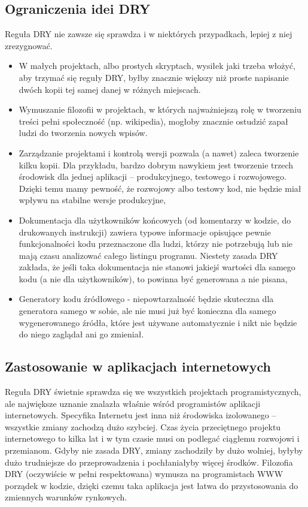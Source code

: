 \documentclass[a4paper,12pt,oneside]{report}
\begin{document}
\subsection{Ograniczenia idei DRY}
\label{sub:dry-not}
Reguła DRY nie zawsze się sprawdza i w niektórych przypadkach, lepiej z niej zrezygnować.
\begin{itemize}
  \item W małych projektach, albo prostych skryptach, wysiłek jaki trzeba włożyć, aby trzymać się reguły DRY, byłby znacznie większy niż proste napisanie dwóch kopii tej samej danej w różnych miejscach.
  \item Wymuszanie filozofii w projektach, w których najważniejszą rolę w tworzeniu treści pełni społeczność (np. wikipedia), mogłoby znacznie ostudzić zapał ludzi do tworzenia nowych wpisów.
  \item Zarządzanie projektami i kontrolą wersji pozwala (a nawet) zaleca tworzenie kilku kopii. Dla przykładu, bardzo dobrym nawykiem jest tworzenie trzech środowisk dla jednej aplikacji -- produkcyjnego, testowego i rozwojowego. Dzięki temu mamy pewność, że rozwojowy albo testowy kod, nie będzie miał wpływu na stabilne wersje produkcyjne,
  \item Dokumentacja dla użytkowników końcowych (od komentarzy w kodzie, do drukowanych instrukcji) zawiera typowe informacje opisujące pewnie funkcjonalności kodu przeznaczone dla ludzi, którzy nie potrzebują lub nie mają czasu analizować całego listingu programu. Niestety zasada DRY zakłada, że jeśli taka dokumentacja nie stanowi jakiejś wartości dla samego kodu (a nie dla użytkowników), to powinna być generowana a nie pisana,
  \item Generatory kodu źródłowego - niepowtarzalność będzie skuteczna dla generatora samego w sobie, ale nie musi już być konieczna dla samego wygenerowanego źródła, które jest używane automatycznie i nikt nie będzie do niego zaglądał ani go zmieniał.
\end{itemize}

\subsection{Zastosowanie w aplikacjach internetowych}
\label{dry:web}
Reguła DRY świetnie sprawdza się we wszystkich projektach programistycznych, ale największe uznanie znalazła właśnie wśród programistów aplikacji internetowych. Specyfika Internetu jest inna niż środowiska izolowanego -- wszystkie zmiany zachodzą dużo szybciej. Czas życia przeciętnego projektu internetowego to kilka lat i w tym czasie musi on podlegać ciągłemu rozwojowi i przemianom. Gdyby nie zasada DRY, zmiany zachodziły by dużo wolniej, byłyby dużo trudniejsze do przeprowadzenia i pochłaniałyby więcej środków. Filozofia DRY (oczywiście w pełni respektowana) wymusza na programistach WWW porządek w kodzie, dzięki czemu taka aplikacja jest łatwa do przystosowania do zmiennych warunków rynkowych.
\end{document}
